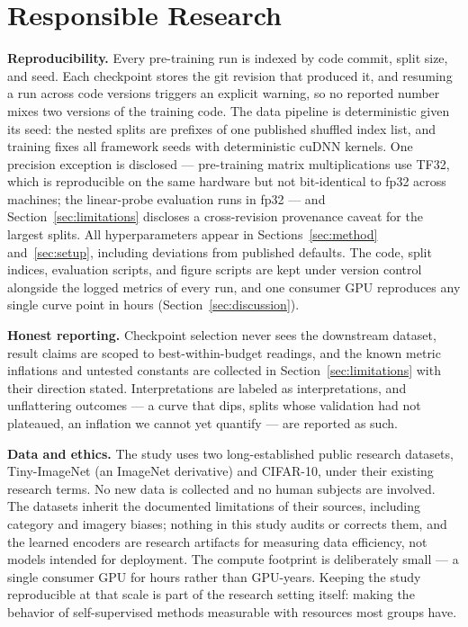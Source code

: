 \section{Responsible Research}
\label{sec:responsible_research}

\textbf{Reproducibility.} Every pre-training run is indexed by code commit,
split size, and seed. Each checkpoint stores the git revision that produced
it, and resuming a run across code versions triggers an explicit warning, so
no reported number mixes two versions of the training code. The data
pipeline is deterministic given its seed: the nested splits are prefixes of
one published shuffled index list, and training fixes all framework seeds
with deterministic cuDNN kernels. One precision exception is disclosed --- pre-training
matrix multiplications use TF32, which is reproducible on the same
hardware but not bit-identical to fp32 across machines; the linear-probe
evaluation runs in fp32 --- and Section~\ref{sec:limitations} discloses a
cross-revision provenance caveat for the largest splits. All hyperparameters appear in
Sections~\ref{sec:method} and~\ref{sec:setup}, including deviations from
published defaults. The code, split indices, evaluation scripts, and figure
scripts are kept under version control alongside the logged metrics of
every run, and one consumer GPU reproduces any single curve point in hours
(Section~\ref{sec:discussion}).

\textbf{Honest reporting.} Checkpoint selection never sees the downstream
dataset, result claims are scoped to best-within-budget readings, and the
known metric inflations and untested constants are collected in
Section~\ref{sec:limitations} with their direction stated. Interpretations
are labeled as interpretations, and unflattering outcomes --- a curve that
dips, splits whose validation had not plateaued, an inflation we cannot yet
quantify --- are reported as such.

\textbf{Data and ethics.} The study uses two long-established public
research datasets, Tiny-ImageNet (an ImageNet derivative) and CIFAR-10,
under their existing research terms. No new data is collected and no human
subjects are involved. The datasets inherit the documented limitations of
their sources, including category and imagery biases; nothing in this study
audits or corrects them, and the learned encoders are research artifacts for
measuring data efficiency, not models intended for deployment. The compute
footprint is deliberately small --- a single consumer GPU for hours rather
than GPU-years. Keeping the study reproducible at that scale is part of the
research setting itself: making the behavior of self-supervised methods
measurable with resources most groups have.
